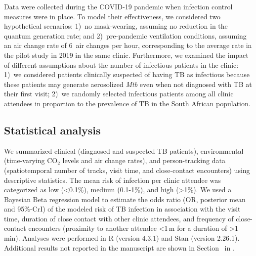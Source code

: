 \documentclass[fleqn,11pt]{wlscirep}
\begin{document}
Data were collected during the COVID-19 pandemic when infection control measures were in place. To model their effectiveness, we considered two hypothetical scenarios: 1)~no mask-wearing, \ie assuming no reduction in the quantum generation rate; and 2)~pre-pandemic ventilation conditions, \ie assuming an air change rate of 6~air changes per hour, corresponding to the average rate in the pilot study in 2019 in the same clinic\cite{Zurcher2022JID}. Furthermore, we examined the impact of different assumptions about the number of infectious patients in the clinic: 1)~we considered patients clinically suspected of having TB as infectious because these patients may generate aerosolized \emph{Mtb} even when not diagnosed with TB at their first visit\cite{Patterson2024PNAS}; 2)~we randomly selected infectious patients among all clinic attendees in proportion to the prevalence of TB in the South African population\cite{Moyo2022LancetID}.  

\subsection*{Statistical analysis}

We summarized clinical (diagnosed and suspected TB patients), environmental (time-varying CO$_2$ levels and air change rates), and person-tracking data (spatiotemporal number of tracks, visit time, and close-contact encounters) using descriptive statistics.   The mean risk of infection per clinic attendee was categorized as low (<0.1\%), medium (0.1-1\%), and high (>1\%). We used a Bayesian Beta regression model to estimate the odds ratio (OR, posterior mean and 95\%-CrI) of the modeled risk of TB infection in association with the visit time, duration of close contact with other clinic attendees, and frequency of close-contact encounters (proximity to another attendee <1\,m for a duration of >1\,min). Analyses were performed in R (version 4.3.1) and Stan (version 2.26.1). Additional results not reported in the manuscript are shown in Section~ in \supp. 
\end{document}
